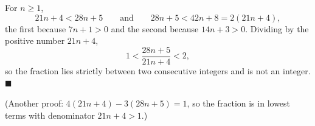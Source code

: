 For $n\ge1$,
\[
21n+4<28n+5\qquad\text{and}\qquad 28n+5<42n+8=2(21n+4),
\]
the first because $7n+1>0$ and the second because $14n+3>0$. Dividing by the positive number $21n+4$,
\[
1<\dfrac{28n+5}{21n+4}<2 ,
\]
so the fraction lies strictly between two consecutive integers and is not an integer. $\blacksquare$

(Another proof: $4(21n+4)-3(28n+5)=1$, so the fraction is in lowest terms with denominator $21n+4>1$.)
